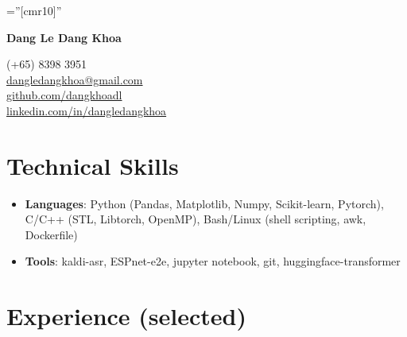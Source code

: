 \documentclass[10pt]{article}
\begin{document}
    \pagestyle{empty}       %
    \font\fb=''[cmr10]''    %

    \begin{multicols}{2}
        \begin{flushleft}
            \textbf{{\Huge Dang Le Dang Khoa }}
        \end{flushleft}

        \columnbreak

        \begin{flushright}
            \normalsize (+65) 8398 3951 \\
            \href{mailto:dangledangkhoa@gmail.com}{dangledangkhoa@gmail.com} \\
            \href{https://github.com/dangkhoadl}{github.com/dangkhoadl} \\
            \href{https://sg.linkedin.com/in/dangledangkhoa}{linkedin.com/in/dangledangkhoa}
        \end{flushright}
    \end{multicols}

    \vspace{-8mm}
    \section{Technical Skills}
    \begin{itemize}[noitemsep,leftmargin=*]
        \item \textbf{Languages}: Python (Pandas, Matplotlib, Numpy, Scikit-learn, Pytorch), C/C++ (STL, Libtorch, OpenMP), Bash/Linux (shell scripting, awk, Dockerfile)
        \item \textbf{Tools}: kaldi-asr, ESPnet-e2e, jupyter notebook, git, huggingface-transformer
    \end{itemize}

    \vspace{2mm}
    \section{Experience (selected)}
        \vspace{-2mm}
\end{document}
